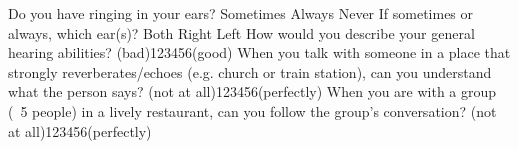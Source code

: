 \documentclass[12pt, a4paper]{article}
\begin{document}
\newline Do you have ringing in your ears?\hspace{6pt} Sometimes \hspace{6pt} Always \hspace{6pt} Never \hspace{6pt}
\newline If sometimes or always, which ear(s)?\hspace{6pt} Both \hspace{6pt} Right \hspace{6pt} Left \hspace{6pt}
\vspace{8pt}
\newline How would you describe your general hearing abilities?
\newline (bad)\hspace{12pt}1\hspace{12pt}2\hspace{12pt}3\hspace{12pt}4\hspace{12pt}5\hspace{12pt}6\hspace{12pt}(good) 
\vspace{8pt}
\newline  When you talk with someone in a place that strongly reverberates/echoes (e.g. church or train station), can you understand what the person says?
\newline (not at all)\hspace{12pt}1\hspace{12pt}2\hspace{12pt}3\hspace{12pt}4\hspace{12pt}5\hspace{12pt}6\hspace{12pt}(perfectly) 
\vspace{8pt}
\newline  When you are with a group (~5 people) in a lively restaurant, can you follow the group's conversation?
\newline (not at all)\hspace{12pt}1\hspace{12pt}2\hspace{12pt}3\hspace{12pt}4\hspace{12pt}5\hspace{12pt}6\hspace{12pt}(perfectly)
\vspace{8pt}
\end{document}
